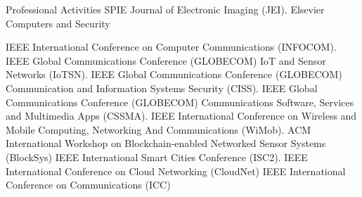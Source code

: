 \begin{rubric}{Professional Activities}
\entry*[]
SPIE Journal of Electronic Imaging (JEI).
%
\entry*[]
Elsevier Computers and Security


%
\entry*[]
IEEE International Conference on Computer Communications (INFOCOM).
%
\entry*[]
IEEE Global Communications Conference (GLOBECOM) IoT and Sensor Networks (IoTSN).
%
\entry*[]
IEEE Global Communications Conference (GLOBECOM) Communication and Information Systems Security (CISS).
%
\entry*[]
IEEE Global Communications Conference (GLOBECOM) Communications Software, Services and Multimedia Apps (CSSMA).
%
\entry*[]
IEEE International Conference on Wireless and Mobile Computing, Networking And Communications
(WiMob).
%
\entry*[]
ACM International Workshop on Blockchain-enabled Networked Sensor Systems (BlockSys)
%
\entry*[] 
IEEE International Smart Cities Conference (ISC2).
%
\entry*[] 
IEEE International Conference on Cloud Networking (CloudNet)
%
\entry*[] 
IEEE International Conference on Communications (ICC)
%
\end{rubric}